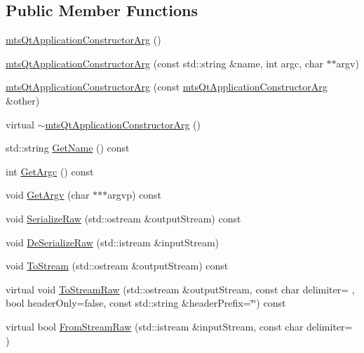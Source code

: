 \subsection*{Public Member Functions}
\begin{DoxyCompactItemize}
\item 
\hyperlink{classmts_qt_application_constructor_arg_afcd358dad87343a7b3116206bfce7e2e}{mts\+Qt\+Application\+Constructor\+Arg} ()
\item 
\hyperlink{classmts_qt_application_constructor_arg_afc38ecc80313f2757a47ae960b782863}{mts\+Qt\+Application\+Constructor\+Arg} (const std\+::string \&name, int argc, char $\ast$$\ast$argv)
\item 
\hyperlink{classmts_qt_application_constructor_arg_abca1e32780f6396a85a105b680ecc6f5}{mts\+Qt\+Application\+Constructor\+Arg} (const \hyperlink{classmts_qt_application_constructor_arg}{mts\+Qt\+Application\+Constructor\+Arg} \&other)
\item 
virtual \hyperlink{classmts_qt_application_constructor_arg_af5fdd1e0560d96d9c61c37501a5291a5}{$\sim$mts\+Qt\+Application\+Constructor\+Arg} ()
\item 
std\+::string \hyperlink{classmts_qt_application_constructor_arg_a4fb28fa4e6cfb6a01458d33f00c69164}{Get\+Name} () const 
\item 
int \hyperlink{classmts_qt_application_constructor_arg_a226bb4c49431296da7981a7fc0de7c34}{Get\+Argc} () const 
\item 
void \hyperlink{classmts_qt_application_constructor_arg_a23489b12ec7629950875cfd039657a73}{Get\+Argv} (char $\ast$$\ast$$\ast$argvp) const 
\item 
void \hyperlink{classmts_qt_application_constructor_arg_aa6562b7c1a3d19ef8356d5bb570fe072}{Serialize\+Raw} (std\+::ostream \&output\+Stream) const 
\item 
void \hyperlink{classmts_qt_application_constructor_arg_a60a48ec89c96b33d7d5bd61809d09a6b}{De\+Serialize\+Raw} (std\+::istream \&input\+Stream)
\item 
void \hyperlink{classmts_qt_application_constructor_arg_a6d1e2aadac2c41e45bbabc01892d6d34}{To\+Stream} (std\+::ostream \&output\+Stream) const 
\item 
virtual void \hyperlink{classmts_qt_application_constructor_arg_adab540a9de65d898b488a3628bf46bf3}{To\+Stream\+Raw} (std\+::ostream \&output\+Stream, const char delimiter= \textquotesingle{} \textquotesingle{}, bool header\+Only=false, const std\+::string \&header\+Prefix=\char`\"{}\char`\"{}) const 
\item 
virtual bool \hyperlink{classmts_qt_application_constructor_arg_affc0d2d62bde80207d708f5e20ab1188}{From\+Stream\+Raw} (std\+::istream \&input\+Stream, const char delimiter= \textquotesingle{} \textquotesingle{})
\end{DoxyCompactItemize}


